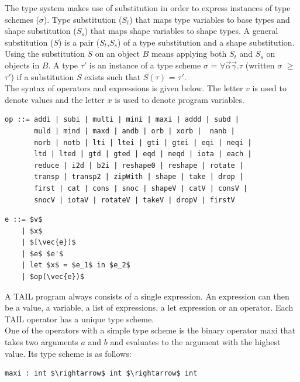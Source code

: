 \documentclass[11pt]{article}
\begin{document}
The type system makes use of substitution in order to express instances of type schemes ($\sigma$). Type substitution ($S_t$) that maps type variables to base types and shape substitution ($S_s$) that maps shape variables to shape types. A general substitution ($S$) is a pair ($S_t$,$S_s$) of a type substitution and a shape substitution. Using the substitution $S$ on an object $B$ means applying 
both $S_t$ and $S_s$ on objects in $B$. A type $\tau'$ is an instance of a type scheme $\sigma$ = $\forall\vec{\alpha}\vec{\gamma}$.$\tau$ (written $\sigma$ $\geq$ $\tau'$) if a substitution $S$ exists such that $S(\tau)$ = $\tau'$. \\

The syntax of operators and expressions is given below. The letter $v$ is used to denote values and the letter $x$ is used to denote program variables. 
\begin{lstlisting}[numbers=none,frame=none]
op ::= addi | subi | multi | mini | maxi | addd | subd | 
       muld | mind | maxd | andb | orb | xorb |  nanb | 
       norb | notb | lti | ltei | gti | gtei | eqi | neqi |
       ltd | lted | gtd | gted | eqd | neqd | iota | each |
       reduce | i2d | b2i | reshape0 | reshape | rotate |
       transp | transp2 | zipWith | shape | take | drop |
       first | cat | cons | snoc | shapeV | catV | consV | 
       snocV | iotaV | rotateV | takeV | dropV | firstV 
\end{lstlisting}

\begin{lstlisting}[numbers=none,frame=none]
e ::= $v$ 
    | $x$ 
    | $[\vec{e}]$ 
    | $e$ $e'$ 
    | let $x$ = $e_1$ in $e_2$ 
    | $op(\vec{e})$
\end{lstlisting}
A TAIL program always consists of a single expression. An expression can then be a value, a variable, 
a list of expressions, a let expression or an operator. Each TAIL operator has a unique type scheme. \\

One of the operators with a simple type scheme is the binary operator maxi that takes two arguments $a$ and $b$ and evaluates to the argument with the highest value. Its type scheme is as follows:
\begin{lstlisting}[numbers=none,frame=none]
maxi : int $\rightarrow$ int $\rightarrow$ int
\end{lstlisting}
\end{document}
